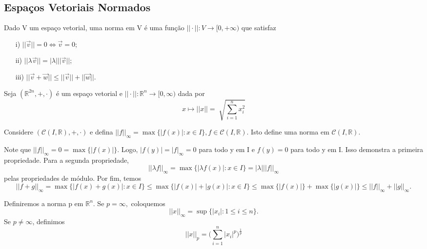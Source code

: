 \documentclass[metric_notes.tex]{subfiles}
\begin{document}
\subsection{Espaços Vetoriais Normados}
\begin{def*}
	Dado V um espaço vetorial, uma norma em V é uma função \(||\cdot ||:V\rightarrow [0, +\infty)\) que satisfaz
	\begin{itemize}
		\item[i)] \(||\vec{v}|| = 0 \Longleftrightarrow \vec{v}=0\);
		\item[ii)] \(||\lambda \vec{v}|| = |\lambda |||\vec{v}||\);
		\item[iii)] \(||\vec{v}+\vec{w}||\leq ||\vec{v}|| + ||\vec{w}||\).
	\end{itemize}
\end{def*}
\begin{example}
	Seja \((\mathbb{R}^{2n}, +, \cdot )\) é um espaço vetorial e \(||\cdot ||:\mathbb{R}^{n}\rightarrow [0, \infty)\) dada por
	\[
		x\mapsto ||x|| = \sqrt[]{\sum\limits_{i=1}^{n}x_{i}^{2}}
	\]
\end{example}
\begin{example}
	Considere \((\mathcal{C}(I, \mathbb{R}), +, \cdot )\) e defina \(||f||_{\infty} = \max \biggl\{|f(x)|: x\in I\biggr\}, f\in \mathcal{C}(I, \mathbb{R}).\) Isto define uma norma em
	\(\mathcal{C}(I, \mathbb{R}).\)

	Note que \(||f||_{\infty} = 0 = \max\{|f(x)|\}.\) Logo, \(|f(y)| = |f|_{\infty} = 0\) para todo y em I e \(f(y) = 0\) para todo y em I.
	Isso demonstra a primeira propriedade. Para a segunda propriedade,
	\[
		||\lambda f||_{\infty} = \max\{|\lambda f(x)|: x\in I\} = |\lambda |||f||_{\infty}
	\]
	pelas propriedades de módulo. Por fim, temos
	\[
		||f+g||_{\infty} = \max\{|f(x)+g(x)|: x\in I\}\leq \max\{|f(x)| + |g(x)|: x\in I\}\leq \max\{|f(x)|\} + \max\{|g(x)|\}\leq ||f||_{\infty} + ||g||_{\infty}.
	\]
\end{example}
\begin{example}
	Definiremos a norma p em \(\mathbb{R}^{n}\). Se \(p=\infty,\) coloquemos
	\[
		||x||_{\infty} = \sup\{|x_{i}|: 1\leq i\leq n\}.
	\]
	Se \(p\neq\infty\), definimos
	\[
		||x||_{p} = \biggl(\sum\limits_{i=1}^{n}|x_{i}|^{p}\biggr)^{\frac{1}{p}}
	\]
\end{example}
\end{document}
